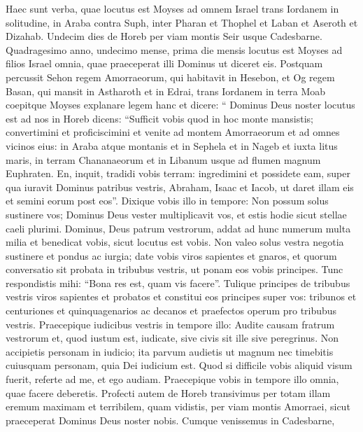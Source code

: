 \begin{biblechapter}
 \verse Haec sunt verba, quae locutus est Moyses ad omnem Israel trans Iordanem in solitudine, in Araba contra Suph, inter Pharan et Thophel et Laban et Aseroth et Dizahab. 
\verse Undecim dies de Horeb per viam montis Seir usque Cadesbarne. 
\verse Quadragesimo anno, undecimo mense, prima die mensis locutus est Moyses ad filios Israel omnia, quae praeceperat illi Dominus ut diceret eis. 
\verse Postquam percussit Sehon regem Amorraeorum, qui habitavit in Hesebon, et Og regem Basan, qui mansit in Astharoth et in Edrai, 
\verse trans Iordanem in terra Moab coepitque Moyses explanare legem hanc et dicere: 
\verse “ Dominus Deus noster locutus est ad nos in Horeb dicens: “Sufficit vobis quod in hoc monte mansistis; 
\verse convertimini et proficiscimini et venite ad montem Amorraeorum et ad omnes vicinos eius: in Araba atque montanis et in Sephela et in Nageb et iuxta litus maris, in terram Chananaeorum et in Libanum usque ad flumen magnum Euphraten. 
\verse En, inquit, tradidi vobis terram: ingredimini et possidete eam, super qua iuravit Dominus patribus vestris, Abraham, Isaac et Iacob, ut daret illam eis et semini eorum post eos”.
 \verse Dixique vobis illo in tempore: Non possum solus sustinere vos; 
\verse Dominus Deus vester multiplicavit vos, et estis hodie sicut stellae caeli plurimi. 
 \verse Dominus, Deus patrum vestrorum, addat ad hunc numerum multa milia et benedicat vobis, sicut locutus est vobis. 
\verse Non valeo solus vestra negotia sustinere et pondus ac iurgia; 
\verse date vobis viros sapientes et gnaros, et quorum conversatio sit probata in tribubus vestris, ut ponam eos vobis principes. 
\verse Tunc respondistis mihi: “Bona res est, quam vis facere”. 
 \verse Tulique principes de tribubus vestris viros sapientes et probatos et constitui eos principes super vos: tribunos et centuriones et quinquagenarios ac decanos et praefectos operum pro tribubus vestris. 
\verse Praecepique iudicibus vestris in tempore illo: Audite causam fratrum vestrorum et, quod iustum est, iudicate, sive civis sit ille sive peregrinus. 
\verse Non accipietis personam in iudicio; ita parvum audietis ut magnum nec timebitis cuiusquam personam, quia Dei iudicium est. Quod si difficile vobis aliquid visum fuerit, referte ad me, et ego audiam.
 \verse Praecepique vobis in tempore illo omnia, quae facere deberetis.
 \verse Profecti autem de Horeb transivimus per totam illam eremum maximam et terribilem, quam vidistis, per viam montis Amorraei, sicut praeceperat Dominus Deus noster nobis. Cumque venissemus in Cadesbarne, 

\end{biblechapter}
